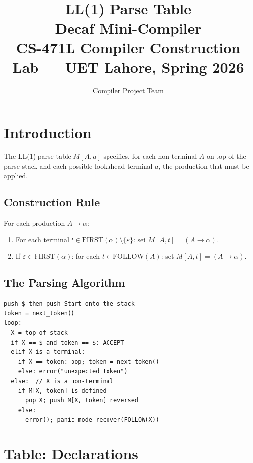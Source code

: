 \documentclass[12pt,a4paper]{article}
\title{\textbf{LL(1) Parse Table}\\
       \large Decaf Mini-Compiler\\
       CS-471L Compiler Construction Lab --- UET Lahore, Spring 2026}
\author{Compiler Project Team}
\date{}
\begin{document}
\maketitle
\tableofcontents
\newpage

\section{Introduction}

The LL(1) parse table $M[A, a]$ specifies, for each non-terminal $A$ on top
of the parse stack and each possible lookahead terminal $a$, the production
that must be applied.

\subsection{Construction Rule}

For each production $A \to \alpha$:
\begin{enumerate}
  \item For each terminal $t \in \text{FIRST}(\alpha) \setminus \{\varepsilon\}$:
        set $M[A, t] = (A \to \alpha)$.
  \item If $\varepsilon \in \text{FIRST}(\alpha)$: for each $t \in \text{FOLLOW}(A)$:
        set $M[A, t] = (A \to \alpha)$.
\end{enumerate}

\subsection{The Parsing Algorithm}

\begin{lstlisting}[style=pseudo]
push $ then push Start onto the stack
token = next_token()
loop:
  X = top of stack
  if X == $ and token == $: ACCEPT
  elif X is a terminal:
    if X == token: pop; token = next_token()
    else: error("unexpected token")
  else:  // X is a non-terminal
    if M[X, token] is defined:
      pop X; push M[X, token] reversed
    else:
      error(); panic_mode_recover(FOLLOW(X))
\end{lstlisting}

\section{Table: Declarations}
\end{document}
